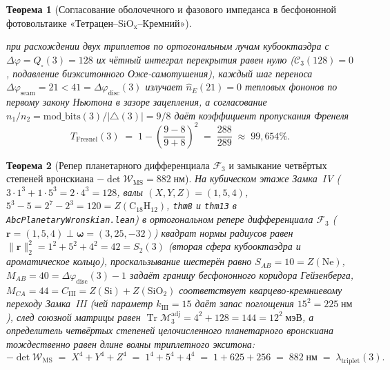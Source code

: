 \documentclass[11pt,a4paper]{article}
\theoremstyle{plain}
\newtheorem{theorem}{Теорема}[section]
\theoremstyle{definition}
\begin{document}
\begin{theorem}[Согласование оболочечного и фазового импеданса в бесфононной фотовольтаике «Тетрацен--$\mathrm{SiO_x}$--Кремний»]
\begin{enumerate}[label=\textbf{(\roman*)},leftmargin=*]
  при расхождении двух триплетов по ортогональным лучам кубооктаэдра с $\Delta\varphi = Q_\square(3) = 128$ их чётный интеграл перекрытия равен нулю ($\mathcal{C}_3(128) = 0$, подавление биэкситонного Оже-самотушения), каждый шаг переноса $\Delta\varphi_{\mathrm{seam}} = 21 < 41 = \Delta\varphi_{\mathrm{disc}}(3)$ излучает $\hat{n}_E(21) = 0$ тепловых фононов по первому закону Ньютона в зазоре зацепления, а согласование $n_1/n_2 = \mathrm{mod\_bits}(3)/|{\triangle}(3)| = 9/8$ даёт коэффициент пропускания Френеля
  \[
    T_{\mathrm{Fresnel}}(3) \;=\; 1 - \left(\frac{9-8}{9+8}\right)^2 \;=\; \frac{288}{289} \;\approx\; 99{,}654\%.
  \]
\end{enumerate}
\end{theorem}

\begin{theorem}[Репер планетарного дифференциала $\mathcal{F}_3$ и замыкание четвёртых степеней вронскиана $-\det\mathcal{W}_{\mathrm{MS}} = 882\;\text{нм}$]
\label{thm:solar-wronskian-882}
На кубическом этаже Замка~IV ($3\cdot 1^3 + 1\cdot 5^3 = 2\cdot 4^3 = 128$, валы $(X,Y,Z) = (1,5,4)$, $5^3 - 5 = 2^7 - 2^3 = 120 = Z(\mathrm{C_{18}H_{12}})$, \texttt{thm8} и \texttt{thm13} в \texttt{AbcPlanetaryWronskian.lean}) в ортогональном репере дифференциала $\mathcal{F}_3$ ($\mathbf{r} = (1,5,4)\perp\mathbf{\omega} = (3,25,-32)$) квадрат нормы радиусов равен $\|\mathbf{r}\|_2^2 = 1^2 + 5^2 + 4^2 = 42 = S_2(3)$ (вторая сфера кубооктаэдра и ароматическое кольцо), проскальзывание шестерён равно $S_{AB} = 10 = Z(\mathrm{Ne})$, $M_{AB} = 40 = \Delta\varphi_{\mathrm{disc}}(3) - 1$ задаёт границу бесфононного коридора Гейзенберга, $M_{CA} = 44 = C_{\mathrm{III}} = Z(\mathrm{Si}) + Z(\mathrm{SiO_2})$ соответствует кварцево-кремниевому переходу Замка~III (чей параметр $k_{\mathrm{III}} = 15$ даёт запас поглощения $15^2 = 225\;\text{нм}$), след союзной матрицы равен $\operatorname{Tr}\mathcal{M}_3^{\mathrm{adj}} = 4^2 + 128 = 144 = 12^2\;\text{мэВ}$, а определитель четвёртых степеней целочисленного планетарного вронскиана тождественно равен длине волны триплетного экситона:
\begin{equation}
  \label{eq:wms-882}
  -\det\mathcal{W}_{\mathrm{MS}} \;=\; X^4 + Y^4 + Z^4 \;=\; 1^4 + 5^4 + 4^4 \;=\; 1 + 625 + 256 \;=\; 882\;\text{нм} \;=\; \lambda_{\mathrm{triplet}}(3).
\end{equation}
\end{theorem}
\end{document}
